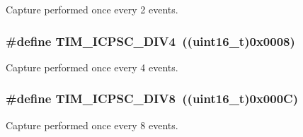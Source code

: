 \label{group__TIM__Input__Capture__Prescaler_ga1d8a7b66add914e2ddd910d2d700978f}
Capture performed once every 2 events. \hypertarget{group__TIM__Input__Capture__Prescaler_gaf5a675046430fa0f0c95b0dac612828f}{
\subsubsection[{TIM\_\-ICPSC\_\-DIV4}]{\setlength{\rightskip}{0pt plus 5cm}\#define TIM\_\-ICPSC\_\-DIV4~((uint16\_\-t)0x0008)}}
\label{group__TIM__Input__Capture__Prescaler_gaf5a675046430fa0f0c95b0dac612828f}
Capture performed once every 4 events. \hypertarget{group__TIM__Input__Capture__Prescaler_ga5086cb03c89a5c67b199d20b605f00cb}{
\subsubsection[{TIM\_\-ICPSC\_\-DIV8}]{\setlength{\rightskip}{0pt plus 5cm}\#define TIM\_\-ICPSC\_\-DIV8~((uint16\_\-t)0x000C)}}
\label{group__TIM__Input__Capture__Prescaler_ga5086cb03c89a5c67b199d20b605f00cb}
Capture performed once every 8 events. 